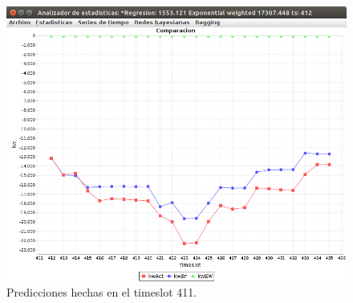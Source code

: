 \begin{figure}[h]
	\centering
	\includegraphics[width=12cm]{img/interrumpibleTimeslot411.png}
	\caption{Predicciones hechas en el timeslot 411.}
	\label{fig:interrumpibleTimeslot411}
\end{figure}
